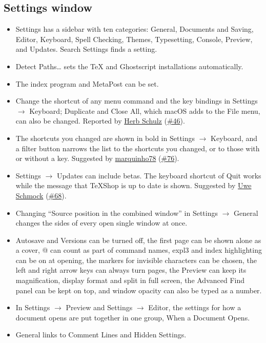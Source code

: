 \documentclass[11pt,letterpaper]{article}
\begin{document}
\subsection{Settings window}

\begin{itemize}
\item Settings has a sidebar with ten categories: General, Documents and Saving, Editor, Keyboard, Spell Checking, Themes, Typesetting, Console, Preview, and Updates. Search Settings finds a setting.
\item Detect Paths… sets the TeX and Ghostscript installations automatically.
\item The index program and MetaPost can be set.
\item Change the shortcut of any menu command and the key bindings in Settings \(\rightarrow\) Keyboard; Duplicate and Close All, which macOS adds to the File menu, can also be changed. Reported by \href{https://github.com/herbs}{Herb Schulz} (\href{https://github.com/TeXShopProject/TeXShop/issues/46}{\#46}).
\item The shortcuts you changed are shown in bold in Settings \(\rightarrow\) Keyboard, and a filter button narrows the list to the shortcuts you changed, or to those with or without a key. Suggested by \href{https://github.com/marquinho78}{marquinho78} (\href{https://github.com/TeXShopProject/TeXShop/issues/76}{\#76}).
\item Settings \(\rightarrow\) Updates can include betas. The keyboard shortcut of Quit works while the message that TeXShop is up to date is shown. Suggested by \href{https://github.com/Uwe-Schmock}{Uwe Schmock} (\href{https://github.com/TeXShopProject/TeXShop/issues/68}{\#68}).
\item Changing “Source position in the combined window” in Settings \(\rightarrow\) General changes the sides of every open single window at once.
\item Autosave and Versions can be turned off, the first page can be shown alone as a cover, @ can count as part of command names, expl3 and index highlighting can be on at opening, the markers for invisible characters can be chosen, the left and right arrow keys can always turn pages, the Preview can keep its magnification, display format and split in full screen, the Advanced Find panel can be kept on top, and window opacity can also be typed as a number.
\item In Settings \(\rightarrow\) Preview and Settings \(\rightarrow\) Editor, the settings for how a document opens are put together in one group, When a Document Opens.
\item General links to Comment Lines and Hidden Settings.
\end{itemize}
\end{document}
